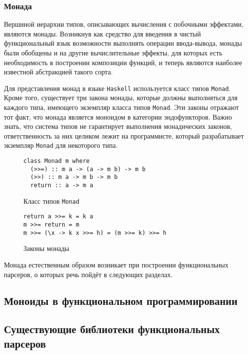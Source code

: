 \subsubsection{Монада}

Вершиной иерархии типов, описывающих вычисления с побочными эффектами, являются монады. Возникнув как средство для введения в чистый функциональный язык возможности выполнять операции ввода-вывода, монады были обобщены и на другие вычислительные эффекты, для которых есть необходимость в построении композиции функций, и теперь являются наиболее известной абстракцией такого сорта.

Для представления монад в языке \lstinline{Haskell} используется класс типов \lstinline{Monad}. Кроме того, существует три закона монады, которые должны выполняться для каждого типа, имеющего экземпляр класса типов \lstinline{Monad}. Эти законы отражают тот факт, что монада является моноидом в категории эндофункторов. Важно знать, что система типов не гарантирует выполнения монадических законов, ответственность за них целиком лежит на программисте, который разрабатывает экземпляр \lstinline{Monad} для некоторого типа. 

\begin{figure}[h]
\begin{lstlisting}
class Monad m where
  (>>=) :: m a -> (a -> m b) -> m b
  (>>) :: m a -> m b -> m b
  return :: a -> m a
\end{lstlisting}
\caption{Класс типов \lstinline{Monad}}
\label{listing:Monad}
\end{figure}

\begin{figure}[h]
\begin{lstlisting}
return a >>= k = k a
m >>= return = m
m >>= (\x -> k x >>= h) = (m >>= k) >>= h
\end{lstlisting}
\caption{Законы монады}
\label{listing:MonadLaws}
\end{figure}

Монада естественным образом возникает при построении функциональных парсеров, о которых речь пойдёт в следующих разделах. 

\subsection{Моноиды в функциональном программировании}

\subsection{Существующие библиотеки функциональных парсеров}

